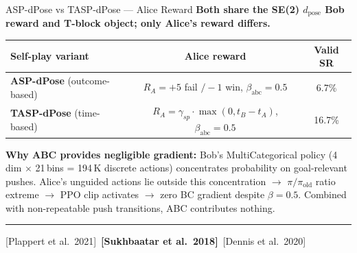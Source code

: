 \documentclass[aspectratio=169,xcolor=dvipsnames,t]{beamer}
\newcommand{\litfooter}[1]{%
  \vspace{2pt}%
  \hrule%
  \vspace{2pt}%
  {\tiny\color{LightDarkGrey} #1}%
}
\begin{document}
\begin{frame}[t]{ASP-dPose vs TASP-dPose — Alice Reward}
  \textbf{Both share the SE(2) $d_{\text{pose}}$ Bob reward and T-block object; only Alice's reward differs.}

  \vspace{4pt}
  \begin{center}
  \small
  \begin{tabular}{lcc}
    \toprule
    \textbf{Self-play variant} & \textbf{Alice reward} & \textbf{Valid SR} \\
    \midrule
    \textbf{ASP-dPose} (outcome-based) & $R_A=+5$ fail $/-1$ win, $\beta_{\text{abc}}{=}0.5$ & \textcolor{hlred}{6.7\%} \\
    \textbf{TASP-dPose} (time-based) & $R_A=\gamma_{sp}\!\cdot\!\max(0,t_B\!-\!t_A)$, $\beta_{\text{abc}}{=}0.5$ & \textcolor{hlred}{16.7\%} \\
    \bottomrule
  \end{tabular}
  \end{center}


  \vspace{2pt}
  {\scriptsize \textbf{Why ABC provides negligible gradient:} Bob's MultiCategorical policy (4\,dim $\times$ 21\,bins = 194\,K discrete actions) concentrates probability on goal-relevant pushes. Alice's unguided actions lie outside this concentration $\rightarrow$ $\pi/\pi_{\text{old}}$ ratio extreme $\rightarrow$ PPO clip activates $\rightarrow$ zero BC gradient despite $\beta{=}0.5$. Combined with non-repeatable push transitions, ABC contributes nothing.}

  \vfill\litfooter{[Plappert et al.\ 2021]~\textbf{[Sukhbaatar et al.\ 2018]}~[Dennis et al.\ 2020]}
\end{frame}
\end{document}
